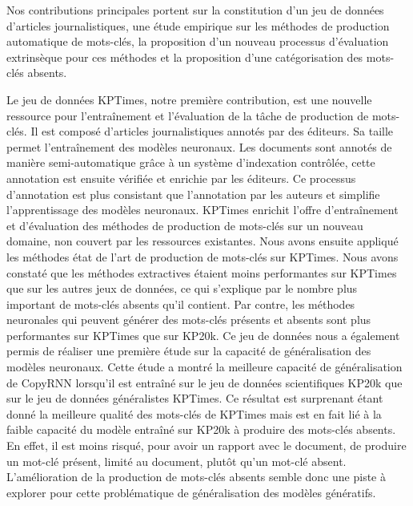 Nos contributions principales portent sur la constitution d'un jeu de données d'articles journalistiques, une étude empirique sur les méthodes de production automatique de mots-clés, la proposition d'un nouveau processus d'évaluation extrinsèque pour ces méthodes et la proposition d'une catégorisation des mots-clés absents. %

Le jeu de données KPTimes, notre première contribution, est une nouvelle ressource pour l'entraînement et l'évaluation de la tâche de production de mots-clés. Il est composé d'articles journalistiques annotés par des éditeurs. Sa taille permet l'entraînement des modèles neuronaux. 
Les documents sont annotés de manière semi-automatique grâce à un système d'indexation contrôlée, cette annotation est ensuite vérifiée et enrichie par les éditeurs.
Ce processus d'annotation est plus consistant que l'annotation par les auteurs et simplifie l'apprentissage des modèles neuronaux.
KPTimes enrichit l'offre d'entraînement et d'évaluation des méthodes de production de mots-clés sur un nouveau domaine, non couvert par les ressources existantes.
%
Nous avons ensuite appliqué les méthodes état de l'art de production de mots-clés sur KPTimes.
Nous avons constaté que les méthodes extractives étaient moins performantes sur KPTimes que sur les autres jeux de données, ce qui s'explique par le nombre plus important de mots-clés absents qu'il contient. Par contre, les méthodes neuronales qui peuvent générer des mots-clés présents et absents sont plus performantes sur KPTimes que sur KP20k.
%
Ce jeu de données nous a également permis de réaliser une première étude sur la capacité de généralisation des modèles neuronaux.
Cette étude a montré la meilleure capacité de généralisation de CopyRNN lorsqu'il est entraîné sur le jeu de données scientifiques KP20k que sur le jeu de données généralistes KPTimes.
%
Ce résultat est surprenant étant donné la meilleure qualité des mots-clés de KPTimes mais est en fait lié à la faible capacité du modèle entraîné sur KP20k à produire des mots-clés absents.
En effet, il est moins risqué, pour avoir un rapport avec le document, de produire un mot-clé présent, limité au document, plutôt qu'un mot-clé absent.
L'amélioration de la production de mots-clés absents semble donc une piste à explorer pour cette problématique de généralisation des modèles génératifs.

